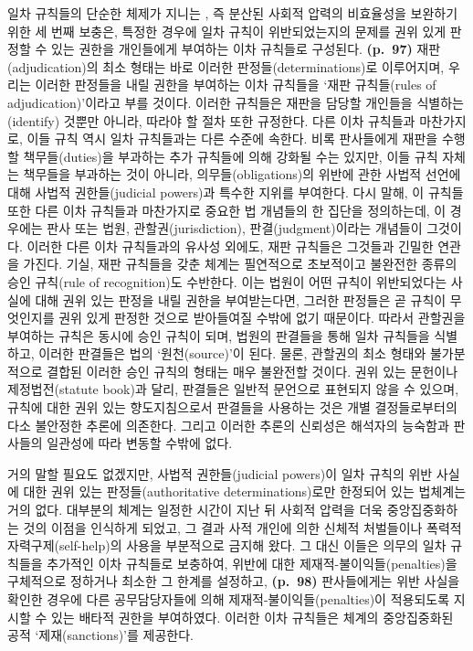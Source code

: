 일차 규칙들의 단순한 체제가 지니는 , 즉
분산된 사회적 압력의 비효율성을 보완하기 위한 세 번째 보충은, 특정한
경우에 일차 규칙이 위반되었는지의 문제를 권위 있게 판정할 수 있는 권한을
개인들에게 부여하는 이차 규칙들로 구성된다. \textbf{(p.~97)}
재판(adjudication)의 최소 형태는 바로 이러한 판정들(determinations)로
이루어지며, 우리는 이러한 판정들을 내릴 권한을 부여하는 이차 규칙들을
‘재판 규칙들(rules of adjudication)’이라고 부를 것이다. 이러한 규칙들은
재판을 담당할 개인들을 식별하는(identify) 것뿐만 아니라, 따라야 할 절차
또한 규정한다. 다른 이차 규칙들과 마찬가지로, 이들 규칙 역시 일차
규칙들과는 다른 수준에 속한다. 비록 판사들에게 재판을 수행할
책무들(duties)을 부과하는 추가 규칙들에 의해 강화될 수는 있지만, 이들
규칙 자체는 책무들을 부과하는 것이 아니라, 의무들(obligations)의 위반에
관한 사법적 선언에 대해 사법적 권한들(judicial powers)과 특수한 지위를
부여한다. 다시 말해, 이 규칙들 또한 다른 이차 규칙들과 마찬가지로 중요한
법 개념들의 한 집단을 정의하는데, 이 경우에는 판사 또는 법원,
관할권(jurisdiction), 판결(judgment)이라는 개념들이 그것이다. 이러한
다른 이차 규칙들과의 유사성 외에도, 재판 규칙들은 그것들과 긴밀한 연관을
가진다. 기실, 재판 규칙들을 갖춘 체계는 필연적으로 초보적이고 불완전한
종류의 승인 규칙(rule of recognition)도 수반한다. 이는 법원이 어떤
규칙이 위반되었다는 사실에 대해 권위 있는 판정을 내릴 권한을
부여받는다면, 그러한 판정들은 곧 규칙이 무엇인지를 권위 있게 판정한
것으로 받아들여질 수밖에 없기 때문이다. 따라서 관할권을 부여하는 규칙은
동시에 승인 규칙이 되며, 법원의 판결들을 통해 일차 규칙들을 식별하고,
이러한 판결들은 법의 ‘원천(source)’이 된다. 물론, 관할권의 최소 형태와
불가분적으로 결합된 이러한 승인 규칙의 형태는 매우 불완전할 것이다. 권위
있는 문헌이나 제정법전(statute book)과 달리, 판결들은 일반적 문언으로
표현되지 않을 수 있으며, 규칙에 대한 권위 있는 향도지침으로서 판결들을
사용하는 것은 개별 결정들로부터의 다소 불안정한 추론에 의존한다. 그리고
이러한 추론의 신뢰성은 해석자의 능숙함과 판사들의 일관성에 따라 변동할
수밖에 없다.

거의 말할 필요도 없겠지만, 사법적 권한들(judicial powers)이 일차 규칙의
위반 사실에 대한 권위 있는 판정들(authoritative determinations)로만
한정되어 있는 법체계는 거의 없다. 대부분의 체계는 일정한 시간이 지난 뒤
사회적 압력을 더욱 중앙집중화하는 것의 이점을 인식하게 되었고, 그 결과
사적 개인에 의한 신체적 처벌들이나 폭력적 자력구제(self-help)의 사용을
부분적으로 금지해 왔다. 그 대신 이들은 의무의 일차 규칙들을 추가적인
이차 규칙들로 보충하여, 위반에 대한 제재적-불이익들(penalties)을
구체적으로 정하거나 최소한 그 한계를 설정하고, \textbf{(p.~98)}
판사들에게는 위반 사실을 확인한 경우에 다른 공무담당자들에 의해
제재적-불이익들(penalties)이 적용되도록 지시할 수 있는 배타적 권한을
부여하였다. 이러한 이차 규칙들은 체계의 중앙집중화된 공적
‘제재(sanctions)’를 제공한다.

